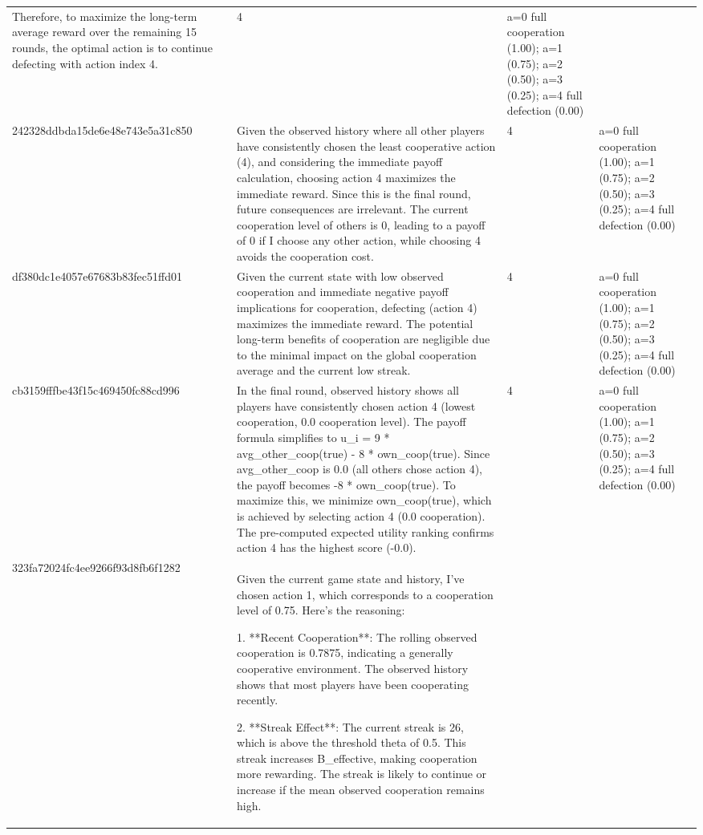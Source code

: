 \begin{tabular}{lp{8cm}ll l}
Therefore, to maximize the long-term average reward over the remaining 15 rounds, the optimal action is to continue defecting with action index 4. & 4 & a=0 full cooperation (1.00); a=1 (0.75); a=2 (0.50); a=3 (0.25); a=4 full defection (0.00) &  \\
242328ddbda15de6e48e743e5a31c850 & Given the observed history where all other players have consistently chosen the least cooperative action (4), and considering the immediate payoff calculation, choosing action 4 maximizes the immediate reward. Since this is the final round, future consequences are irrelevant. The current cooperation level of others is 0, leading to a payoff of 0 if I choose any other action, while choosing 4 avoids the cooperation cost. & 4 & a=0 full cooperation (1.00); a=1 (0.75); a=2 (0.50); a=3 (0.25); a=4 full defection (0.00) &  \\
df380dc1e4057e67683b83fec51ffd01 & Given the current state with low observed cooperation and immediate negative payoff implications for cooperation, defecting (action 4) maximizes the immediate reward. The potential long-term benefits of cooperation are negligible due to the minimal impact on the global cooperation average and the current low streak. & 4 & a=0 full cooperation (1.00); a=1 (0.75); a=2 (0.50); a=3 (0.25); a=4 full defection (0.00) &  \\
cb3159fffbe43f15c469450fc88cd996 & In the final round, observed history shows all players have consistently chosen action 4 (lowest cooperation, 0.0 cooperation level). The payoff formula simplifies to u\_i = 9 * avg\_other\_coop(true) - 8 * own\_coop(true). Since avg\_other\_coop is 0.0 (all others chose action 4), the payoff becomes -8 * own\_coop(true). To maximize this, we minimize own\_coop(true), which is achieved by selecting action 4 (0.0 cooperation). The pre-computed expected utility ranking confirms action 4 has the highest score (-0.0). & 4 & a=0 full cooperation (1.00); a=1 (0.75); a=2 (0.50); a=3 (0.25); a=4 full defection (0.00) &  \\
323fa72024fc4ee9266f93d8fb6f1282 & Given the current game state and history, I've chosen action 1, which corresponds to a cooperation level of 0.75. Here's the reasoning:

1. **Recent Cooperation**: The rolling observed cooperation is 0.7875, indicating a generally cooperative environment. The observed history shows that most players have been cooperating recently.

2. **Streak Effect**: The current streak is 26, which is above the threshold theta of 0.5. This streak increases B\_effective, making cooperation more rewarding. The streak is likely to continue or increase if the mean observed cooperation remains high.


\end{tabular}
